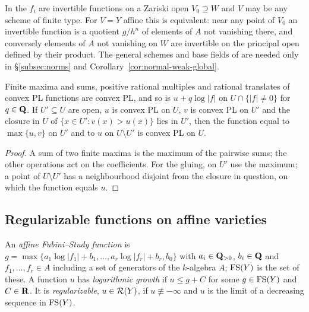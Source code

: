 \begin{remark}\label{rmk:convex-pl-affine}
In \cite[Definition~5.1]{FHX} the $f_i$ are invertible functions on a Zariski open
$V_0\supseteq W$ and $V$ may be any scheme of finite type. For $V=Y$ affine this is equivalent:
near any point of $V_0$ an invertible function is a quotient $g/h^n$ of elements of $A$ not
vanishing there, and conversely elements of $A$ not vanishing on $W$ are invertible on the
principal open defined by their product. The general schemes and base fields of
\cite[Definition~5.1]{FHX} are needed only in \S\ref{subsec:norms} and Corollary~\ref{cor:normal-weak-global}.
\end{remark}

\begin{lemma}\label{lem:local-basic}
\leanok
{}
Finite maxima and sums, positive rational multiples and rational translates of convex PL
functions are convex PL, and so is $u+q\log|f|$ on $U\cap\{|f|\ne0\}$ for $q\in\mathbf{Q}$. If
$U'\subseteq U$ are open, $u$ is convex PL on $U$, $v$ is convex PL on $U'$ and the closure in $U$
of $\{x\in U':v(x)>u(x)\}$ lies in $U'$, then the function equal to $\max\{u,v\}$ on $U'$ and to $u$
on $U\setminus U'$ is convex PL on $U$.
\end{lemma}

\begin{proof}
A sum of two finite maxima is the maximum of the pairwise sums; the other operations act on the
coefficients. For the gluing, on $U'$ use the maximum; a point of $U\setminus U'$ has a
neighbourhood disjoint from the closure in question, on which the function equals $u$.
\end{proof}

\subsection{Regularizable functions on affine varieties}\label{subsec:regularizable}

\begin{definition}\label{def:fs}
\leanok
{}
An \emph{affine Fubini--Study function} is
$g=\max\{a_1\log|f_1|+b_1,\dots,a_r\log|f_r|+b_r,b_0\}$ with $a_i\in\mathbf{Q}_{>0}$, $b_i\in\mathbf{Q}$ and
$f_1,\dots,f_r\in A$ including a set of generators of the $k$-algebra $A$; $\mathrm{FS}(Y)$ is the set of
these. A function $u$ has \emph{logarithmic growth} if $u\le g+C$ for some $g\in\mathrm{FS}(Y)$ and
$C\in\mathbf{R}$. It is \emph{regularizable}, $u\in\mathcal{R}(Y)$, if $u\not\equiv-\infty$ and $u$ is the
limit of a decreasing sequence in $\mathrm{FS}(Y)$.
\end{definition}

